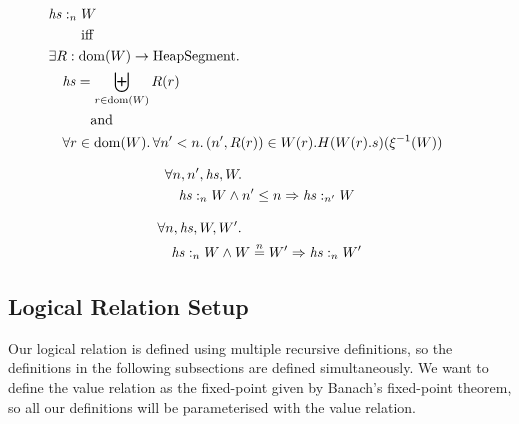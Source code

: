 \documentclass{article}
\newcommand{\nequal}[1][n]{\stackrel{\tiny{#1}}{=}}
\DeclareMathOperator{\dom}{dom}
\newcommand{\var}[1]{\mathit{#1}}
\newcommand{\hs}{\var{hs}}
\newcommand{\heap}{\var{heap}}
\newcommand{\heapSat}[3][\heap]{#1 :_{#2} #3}
\newcommand{\plaindom}[1]{\mathrm{#1}}
\newcommand{\HeapSegments}{\plaindom{HeapSegment}}
\newcommand{\npair}[2][n]{\left(#1,#2 \right)}
\begin{document}
\begin{definition}
\begin{align*}
&\heapSat[\hs]{n}{W} \\
&\qquad\text{ iff }\\
&\exists R : \dom(W) \rightarrow \HeapSegments \ldotp & &\\
&\quad\begin{aligned}
  &\hs = \biguplus_{r \in \dom(W)} R(r) \\
  &\qquad\text{and}\\
  &\forall r \in \dom(W) \ldotp \forall n' < n \ldotp \npair[n']{R(r)} \in W(r).H(W(r).s)(\xi^{-1}(W))
\end{aligned} 
\end{align*}
\end{definition}

\begin{lemma}
\label{lem:heapsat-dc}
  \begin{align*}
    & \forall n,n',\hs, W \ldotp\\
    & \quad \heapSat[\hs]{n}{W} \land n' \leq n \Rightarrow \heapSat[\hs]{n'}{W}
  \end{align*}
\end{lemma}

\begin{lemma}
\label{lem:heapsat-ne}
  \begin{align*}
    & \forall n,\hs, W, W' \ldotp\\
    & \quad \heapSat[\hs]{n}{W} \land W \nequal W' \Rightarrow \heapSat[\hs]{n}{W'}
  \end{align*}
\end{lemma}

\subsection{Logical Relation Setup}
\label{subsec:logical-relation-setup}
Our logical relation is defined using multiple recursive definitions, so the definitions in the following subsections are defined simultaneously. We want to define the value relation as the fixed-point given by Banach's fixed-point theorem, so all our definitions will be parameterised with the value relation.
\end{document}
